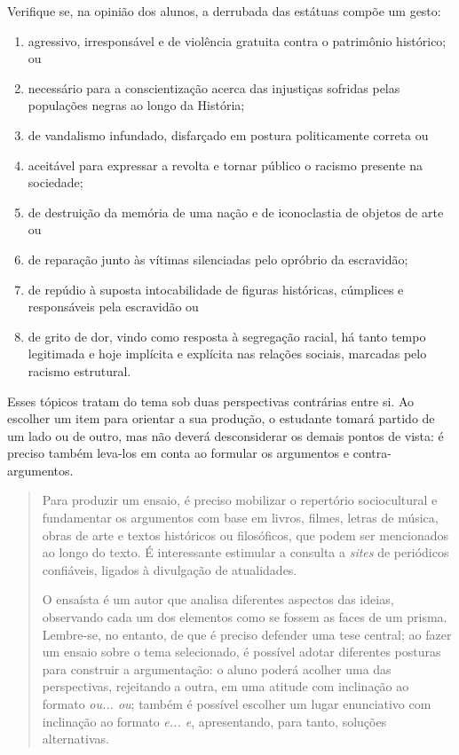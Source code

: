 \documentclass[11pt]{extarticle}
\begin{document}
\begin{enumerate}
Verifique se, na opinião dos alunos, a derrubada das estátuas compõe um
gesto:

\begin{enumerate}
\item agressivo, irresponsável e de violência gratuita contra o
patrimônio histórico; ou 
\item necessário para a conscientização acerca
das injustiças sofridas pelas populações negras ao longo da História;
\item de vandalismo infundado, disfarçado em postura politicamente correta
ou 
\item aceitável para expressar a revolta e tornar público o racismo
presente na sociedade; 
\item de destruição da memória de uma nação e de
iconoclastia de objetos de arte ou 
\item de reparação junto às vítimas
silenciadas pelo opróbrio da escravidão; 
\item de repúdio à suposta
intocabilidade de figuras históricas, cúmplices e responsáveis pela
escravidão ou 
\item de grito de dor, vindo como resposta à segregação
racial, há tanto tempo legitimada e hoje implícita e explícita nas
relações sociais, marcadas pelo racismo estrutural.
\end{enumerate}

Esses tópicos tratam do tema sob duas perspectivas contrárias entre si.
Ao escolher um item para orientar a sua produção, o estudante tomará
partido de um lado ou de outro, mas não deverá desconsiderar os demais
pontos de vista: é preciso também leva-los em conta ao formular os
argumentos e contra-argumentos.

\begin{quote}
Para produzir um ensaio, é preciso mobilizar o repertório sociocultural
e fundamentar os argumentos com base em livros, filmes, letras de
música, obras de arte e textos históricos ou filosóficos, que podem ser
mencionados ao longo do texto. É interessante estimular a consulta a
\emph{sites} de periódicos confiáveis, ligados à divulgação de
atualidades.

O ensaísta é um autor que analisa diferentes aspectos das ideias,
observando cada um dos elementos como se fossem as faces de um prisma.
Lembre-se, no entanto, de que é preciso defender uma tese central; ao
fazer um ensaio sobre o tema selecionado, é possível adotar diferentes
posturas para construir a argumentação: o aluno poderá acolher uma das
perspectivas, rejeitando a outra, em uma atitude com inclinação ao
formato \emph{ou... ou}; também é possível escolher um lugar enunciativo
com inclinação ao formato \emph{e... e}, apresentando, para tanto,
soluções alternativas.


\end{quote}
\end{enumerate}
\end{document}
